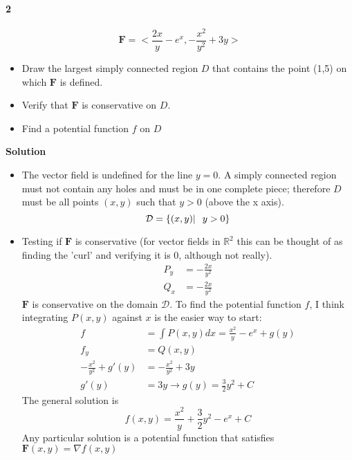 \documentclass{article}
\begin{document}
    \paragraph{2}
    \[\mathbf{F} = <\frac{2x}{y}-e^{x}, -\frac{x^2}{y^2}+3y>\]
    \begin{itemize}
        \item Draw the largest simply connected region $D$ that contains the point (1,5) on which $\mathbf{F}$ is defined.
        \item Verify that $\mathbf{F}$ is conservative on $D$.
        \item Find a potential function $f$ on $D$
    \end{itemize}
    \textbf{Solution}
    \begin{itemize}
        \item The vector field is undefined for the line $y=0$.
        A simply connected region must not contain any holes and must be in one complete piece;
        therefore $D$ must be all points $(x,y)$ such that $y>0$ (above the x axis).
        \[\mathcal{D} =  \{(x,y)|\hspace{0.1in} y >0\}\]
        \item Testing if $\mathbf{F}$ is conservative (for vector fields in $\mathbb{R}^2$ this can be thought of as finding
        the 'curl' and verifying it is 0, although not really).
        \begin{align*}
            P_y &= -\frac{2x}{y^2}\\
            Q_x &= -\frac{2x}{y^2}
        \end{align*}
        $\mathbf{F}$ is conservative on the domain $\mathcal{D}$. To find the potential function $f$, I think integrating $P(x,y)$
        against $x$ is the easier way to start:
        \begin{align*}
            f &= \int P(x,y) dx = \frac{x^2}{y} -e^x + g(y)\\
            f_y &= Q(x,y)\\
            -\frac{x^2}{y^2} +g'(y) &= -\frac{x^2}{y^2}+3y\\
            g'(y) &= 3y \rightarrow g(y) = \frac{3}{2}y^2 + C
        \end{align*}
        The general solution is
        \[f(x,y) = \frac{x^2}{y}+\frac{3}{2}y^2 -e^{x} + C\]
        Any particular solution is a potential function that satisfies $\mathbf{F}(x,y) = \nabla f(x,y)$
    \end{itemize}
\end{document}
